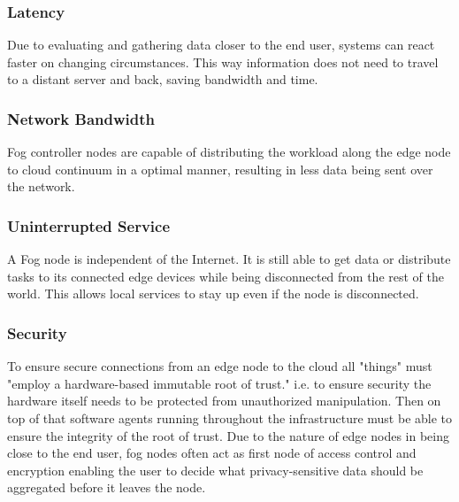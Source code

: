 \subsubsection{Latency}

Due to evaluating and gathering data closer to the end user, systems can react faster on changing circumstances. This way information does not need to travel to a distant server and back, saving bandwidth and time.

\subsubsection{Network Bandwidth}

Fog controller nodes are capable of distributing the workload along the edge node to cloud continuum in a optimal manner, resulting in less data being sent over the network.


\subsubsection{Uninterrupted Service}

A Fog node is independent of the Internet. It is still able to get data or distribute tasks to its connected edge devices while being disconnected from the rest of the world. This allows local services to stay up even if the node is disconnected.

\subsubsection{Security}

To ensure secure connections from an edge node to the cloud all "things" must "employ a hardware-based immutable root of trust."\cite[p.10]{OpenFog} i.e. to ensure security the hardware itself needs to be protected from unauthorized manipulation. Then on top of that software agents running throughout the infrastructure must be able to ensure the integrity of the root of trust. Due to the nature of edge nodes in being close to the end user, fog nodes often act as first node of access control and encryption enabling the user to decide what privacy-sensitive data should be aggregated before it leaves the node.\cite[p.10]{OpenFog}